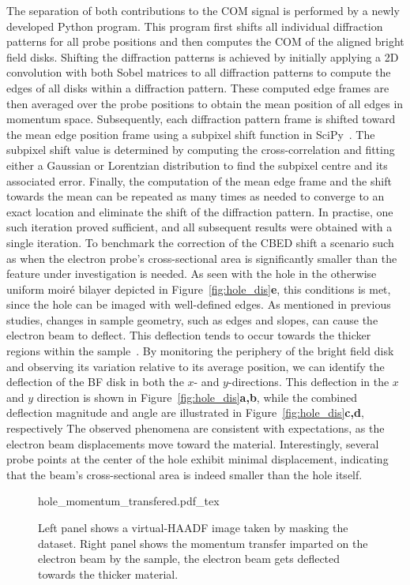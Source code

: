 The separation of both contributions to the COM signal is performed by a newly developed Python program. This program first shifts all individual diffraction patterns for all probe positions and then computes the COM of the aligned bright field disks.
%
Shifting the diffraction patterns is achieved by initially applying a 2D convolution with both Sobel matrices to all diffraction patterns to compute the edges of all disks within a diffraction pattern. These computed edge frames are then averaged over the probe positions to obtain the mean position of all edges in momentum space.
%
Subsequently, each diffraction pattern frame is shifted toward the mean edge position frame using a subpixel shift function in SciPy~\cite{2020SciPy-NMeth}. The subpixel shift value is determined by computing the cross-correlation and fitting either a Gaussian or Lorentzian distribution to find the subpixel centre and its associated error.
%
Finally, the computation of the mean edge frame and the shift towards the mean can be repeated as many times as needed to converge to an exact location and eliminate the shift of the diffraction pattern. In practise, one such iteration proved sufficient, and all subsequent results were obtained with a single iteration.
To benchmark the correction of the CBED shift a scenario such as when the electron probe's cross-sectional area is significantly smaller than the feature under investigation is needed. As seen with the hole in the otherwise uniform moiré bilayer depicted in Figure~\ref{fig:hole_dis}\textbf{e}, this conditions is met, since the hole can be imaged with well-defined edges. 
%
As mentioned in previous studies, changes in sample geometry, such as edges and slopes, can cause the electron beam to deflect.  
%
This deflection tends to occur towards the thicker regions within the sample~\cite{ophusFourDimensionalScanningTransmission2019a,dekkers1974differential}. 
%
By monitoring the periphery of the bright field disk and observing its variation relative to its average position, we can identify the deflection of the BF disk in both the $x$- and $y$-directions. 
%
This deflection in the $x$ and $y$ direction is shown in Figure~\ref{fig:hole_dis}\textbf{a,b}, while the combined deflection magnitude and angle are illustrated in Figure~\ref{fig:hole_dis}\textbf{c,d}, respectively
%
The observed phenomena are consistent with expectations, as the electron beam displacements move toward the material. 
%
Interestingly, several probe points at the center of the hole exhibit minimal displacement, indicating that the beam's cross-sectional area is indeed smaller than the hole itself.
\begin{figure}[h!]
    \centering
    \def\svgwidth{.75\linewidth}
    {hole_momentum_transfered.pdf_tex}
    \caption{Left panel shows a virtual-HAADF image taken by masking the dataset. Right panel shows the momentum transfer imparted on the electron beam by the sample, the electron beam gets deflected towards the thicker material.}
    \label{fig:hole_mom}
\end{figure}


